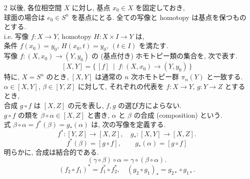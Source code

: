 \documentclass[10pt, leqno]{ltjsarticle}
\numberwithin{equation}{section}
\theoremstyle{plain}
\theoremstyle{definition}
\theoremstyle{remark}
\begin{document}
\begin{paracol}{2}
以後, 各位相空間 $X$ に対し, 
基点 $x_0\in X$ を固定しておき, \\
球面の場合は $e_0\in S^n$ を基点にとる. 
全ての写像と homotopy は基点を保つものとする.\\
i.e.
写像 \(f:X\to Y\),
 homotopy  \(H:X\times I\to Y\)
は, \\
条件 
\(f(x_0) = y_0\), 
\(H(x_0, t) = y_0,\ (t\in I)\)
を満たす.\\
写像 $f:(X,x_0)\to (Y,y_0)$ の (基点付き) ホモトピー類の集合を,
次で表す.
\[
[X,Y]=\{\, [f]\ \mid\ f:(X,x_0)\to (Y,y_0)\,\}
\]
特に, $X=S^n$ のとき,
$[X,Y]$ は通常の $n$ 次ホモトピー群 $\pi_n(Y)$ と一致する. \\
$\alpha\in[X,Y]$, $\beta\in[Y,Z]$ に対して,
それぞれの代表を $f:X\to Y$, $g:Y\to Z$ とするとき, \\
合成
\(g\circ f\) は \([X,Z]\) の元を表し,
\(f, g\) の選び方によらない.\\
\(g\circ f\) の類を
\(\beta\circ \alpha \in [X,Z]\)
と書き, \(\alpha\) と \(\beta\) の合成 (composition) という.\\
式 \(\beta\circ \alpha = f^*(\beta) = g_*(\alpha)\)
は, 次の写像を定義する.
\[
f^*:[Y,Z]\to[X,Z],\quad g_*:[X,Y]\to[X,Z].
\]
\[
f^*(\beta)=[g\circ f],\qquad g_*(\alpha)=[g\circ f]
\]
明らかに, 合成は結合的である. 
\[
(\gamma\circ \beta)\circ\alpha=\gamma\circ(\beta\circ\alpha).
\]
\[
(f_2\circ f_1)^*=f_1^*\circ f_2^*,\quad 
(g_2\circ g_1)_*=g_{2*}\circ g_{1*}.
\]


\end{paracol}
\end{document}
